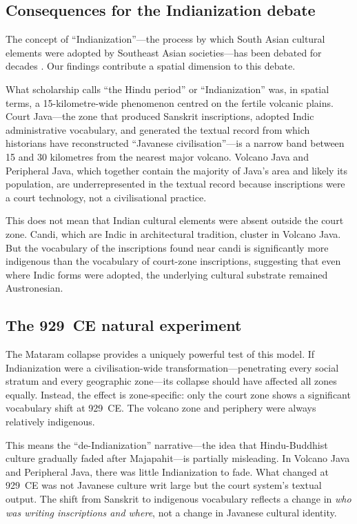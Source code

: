 \documentclass[12pt]{article}
\begin{document}
\subsection{Consequences for the Indianization debate}

The concept of ``Indianization''---the process by which South Asian cultural elements were adopted by Southeast Asian societies---has been debated for decades \citep{Coedes1968, Kulke1990, Pollock2006, Wolters1999}.
Our findings contribute a spatial dimension to this debate.

What scholarship calls ``the Hindu period'' or ``Indianization'' was, in spatial terms, a 15-kilometre-wide phenomenon centred on the fertile volcanic plains.
Court Java---the zone that produced Sanskrit inscriptions, adopted Indic administrative vocabulary, and generated the textual record from which historians have reconstructed ``Javanese civilisation''---is a narrow band between 15 and 30 kilometres from the nearest major volcano.
Volcano Java and Peripheral Java, which together contain the majority of Java's area and likely its population, are underrepresented in the textual record because inscriptions were a court technology, not a civilisational practice.

This does not mean that Indian cultural elements were absent outside the court zone.
Candi, which are Indic in architectural tradition, cluster in Volcano Java.
But the vocabulary of the inscriptions found near candi is significantly more indigenous than the vocabulary of court-zone inscriptions, suggesting that even where Indic forms were adopted, the underlying cultural substrate remained Austronesian.

\subsection{The 929~CE natural experiment}

The Mataram collapse provides a uniquely powerful test of this model.
If Indianization were a civilisation-wide transformation---penetrating every social stratum and every geographic zone---its collapse should have affected all zones equally.
Instead, the effect is zone-specific: only the court zone shows a significant vocabulary shift at 929~CE.
The volcano zone and periphery were always relatively indigenous.

This means the ``de-Indianization'' narrative---the idea that Hindu-Buddhist culture gradually faded after Majapahit---is partially misleading.
In Volcano Java and Peripheral Java, there was little Indianization to fade.
What changed at 929~CE was not Javanese culture writ large but the court system's textual output.
The shift from Sanskrit to indigenous vocabulary reflects a change in \emph{who was writing inscriptions and where}, not a change in Javanese cultural identity.
\end{document}
